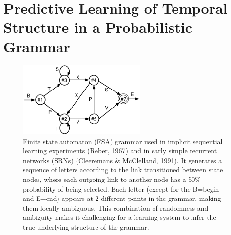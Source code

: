 \documentclass[11pt,twoside]{article}
\newif\myifpdf
\begin{document}
\section{Predictive Learning of Temporal Structure in a Probabilistic Grammar}

\begin{figure}
  \centering\includegraphics[width=2.5in]{fig_reber_grammar_fsa}
  \caption{\footnotesize Finite state automaton (FSA) grammar used in implicit sequential learning experiments (Reber, 1967) and in early simple recurrent networks (SRNs) (Cleeremans \& McClelland, 1991).  It generates a sequence of letters according to the link transitioned between state nodes, where each outgoing link to another node has a 50\% probability of being selected.  Each letter (except for the B=begin and E=end) appears at 2 different points in the grammar, making them locally ambiguous.  This combination of randomness and ambiguity makes it challenging for a learning system to infer the true underlying structure of the grammar.}
  \label{fig.fsa_grammar}
\end{figure}
\end{document}
